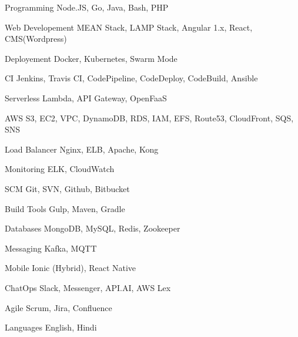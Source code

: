 

\begin{cvskills}


\cvskill
{Programming} %
{Node.JS, Go, Java, Bash, PHP} %


\cvskill
{Web Developement} %
{MEAN Stack, LAMP Stack, Angular 1.x, React, CMS(Wordpress)} %

\cvskill
{Deployement} %
{Docker, Kubernetes, Swarm Mode} %

\cvskill
{CI} %
{Jenkins, Travis CI, CodePipeline, CodeDeploy, CodeBuild, Ansible} %

\cvskill
{Serverless} %
{Lambda, API Gateway, OpenFaaS} %


\cvskill
{AWS} %
{S3, EC2, VPC, DynamoDB, RDS, IAM, EFS, Route53, CloudFront, SQS, SNS} %

\cvskill
{Load Balancer} %
{Nginx, ELB, Apache, Kong} %

\cvskill
{Monitoring} %
{ELK, CloudWatch} %

\cvskill
{SCM} %
{Git, SVN, Github, Bitbucket} %

\cvskill
{Build Tools} %
{Gulp, Maven, Gradle} %


\cvskill
{Databases} %
{MongoDB, MySQL, Redis, Zookeeper} %

\cvskill
{Messaging} %
{Kafka, MQTT} %

\cvskill
{Mobile} %
{Ionic (Hybrid), React Native} %

\cvskill
{ChatOps} %
{Slack, Messenger, API.AI, AWS Lex} %

\cvskill
{Agile} %
{Scrum, Jira, Confluence} %


\cvskill
{Languages} %
{English, Hindi} %


\end{cvskills}
